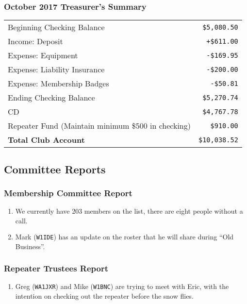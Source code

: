 \documentclass[10pt,letterpaper]{article}
\begin{document}
\subsubsection{October 2017 Treasurer's Summary}
\noindent
\begin{tabular}{|l|r|}
  \hline
  Beginning Checking Balance & \texttt{\$5,080.50} \\
  Income: Deposit & \texttt{+\$611.00} \\
  Expense: Equipment & \texttt{-\$169.95} \\
  Expense: Liability Insurance & \texttt{-\$200.00} \\
  Expense: Membership Badges & \texttt{-\$50.81} \\
  Ending Checking Balance & \texttt{\$5,270.74} \\
  \hline
  \hline
  CD & \texttt{\$4,767.78} \\
  \hline
  \hline
  Repeater Fund (Maintain minimum \$500 in checking) & \texttt{\$910.00} \\
  \hline
  \hline
  \textbf{Total Club Account} & \texttt{\$10,038.52} \\
  \hline
\end{tabular}

\subsection{Committee Reports}

\subsubsection{Membership Committee Report}
\begin{enumerate}
  \item We currently have 203 members on the list, there are eight people without a call.
  \item Mark (\texttt{W1IDE}) has an update on the roster that he will share during ``Old Business''.
\end{enumerate}

\subsubsection{Repeater Trustees Report}
\begin{enumerate}
  \item Greg (\texttt{WA1JXR}) and Mike (\texttt{W1BNC}) are trying to meet with Eric, with the intention on checking out the repeater before the snow flies.
\end{enumerate}
\end{document}
